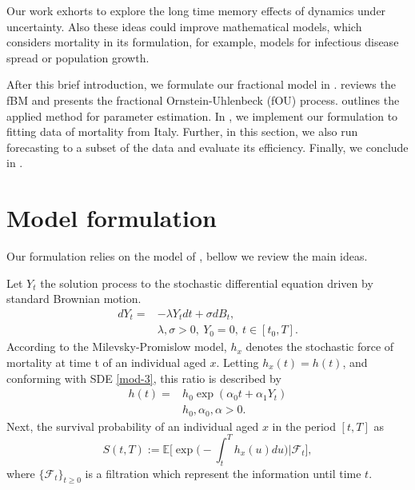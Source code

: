 \documentclass[smallextended]{svjour3}
\newcommand{\E}{\mathbb{E}}
\begin{document}
       
        Our work exhorts to explore the long time memory effects of dynamics 
    under uncertainty. Also these ideas could improve mathematical models, 
    which considers mortality in its formulation, for example, models for 
    infectious  disease spread or population growth.
    

        After this brief introduction, we formulate our fractional model in 
    .  reviews the fBM and presents
    the fractional Ornstein-Uhlenbeck (fOU) process.  outlines the
    applied method for parameter estimation. In  , we implement our
    formulation to fitting data of mortality from Italy. Further, in
    this section, we also run forecasting to a subset of the data and evaluate
    its efficiency. Finally, we conclude in .

\section{Model formulation}\label{model-form}
       Our formulation relies on the model of \cite{mi-pr}, bellow we review 
    the main ideas.
    
        Let $Y_t$ the solution process to the stochastic differential equation 
    driven by standard Brownian motion.
    \begin{equation} \label{mod-3}
        \begin{aligned}
            dY_t  = & -\lambda Y_t dt + \sigma dB_t,
            \\
            & \lambda, \sigma > 0, \ Y_0 = 0, \ t \in [t_0,T] .
        \end{aligned}
    \end{equation}
        According to the Milevsky-Promislow model, $h_x$ denotes the 
    stochastic force of mortality at time t of an individual aged $x$. Letting 
    $h_x(t) = h(t)$, and conforming  with SDE \eqref{mod-3}, this ratio is 
    described by 
    \begin{equation}
        \label{eqn:mortality_hazard_rate}
        \begin{aligned}
            h(t)  = & h_0
                \exp(\alpha_0t + \alpha_1 Y_t)
            \\
            & h_0, \alpha_0, \alpha > 0.
        \end{aligned}
    \end{equation}
     Next, the survival probability of an individual aged $x$ in the period 
    $[t,T]$ as
    \begin{equation}\label{E-surv}
        S(t,T):=
            \E
            \Big[
                \exp\Big(
                    -\int_t^T h_x(u) du
                    \Big)
                \Big|\mathcal{F}_t 
            \Big],
    \end{equation}
    where $\{\mathcal{F}_t\}_{t\ge 0} $ is a filtration which represent the 
    information until time $t$.
\end{document}
